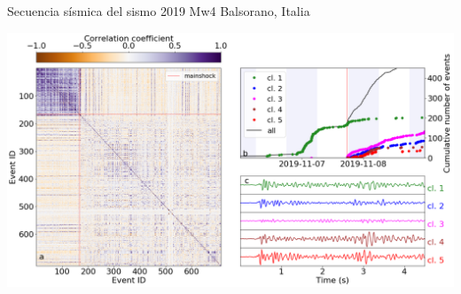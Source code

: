 \documentclass{beamer}
\begin{document}
\begin{frame}
 {Secuencia s\'ismica del sismo 2019 Mw4 Balsorano, Italia}

 \begin{minipage}{1\linewidth}
  \centering \includegraphics[width=1\linewidth]{images/wigg_cc_mat_cluster.png}
 \end{minipage} 
 
\end{frame}
\end{document}
